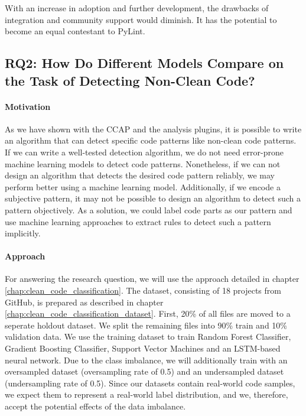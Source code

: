 With an increase in adoption and further development, the drawbacks of integration and community support would diminish. It has the potential to become an equal contestant to PyLint.

\subsection{RQ2: How Do Different Models Compare on the Task of Detecting Non-Clean Code?}\label{rq:2}
\paragraph{Motivation}
As we have shown with the CCAP and the analysis plugins, it is possible to write an algorithm that can detect specific code patterns like non-clean code patterns. If we can write a well-tested detection algorithm, we do not need error-prone machine learning models to detect code patterns. Nonetheless, if we can not design an algorithm that detects the desired code pattern reliably, we may perform better using a machine learning model. Additionally, if we encode a subjective pattern, it may not be possible to design an algorithm to detect such a pattern objectively. As a solution, we could label code parts as our pattern and use machine learning approaches to extract rules to detect such a pattern implicitly.


\paragraph{Approach}\label{par:approach}
For answering the research question, we will use the approach detailed in chapter \ref{chap:clean_code_classification}.  The dataset, consisting of 18 projects from GitHub, is prepared as described in chapter \ref{chap:clean_code_classification_dataset}. First, 20\% of all files are moved to a seperate holdout dataset. We split the remaining files into 90\% train and 10\% validation data. We use the training dataset to train Random Forest Classifier, Gradient Boosting Classifier, Support Vector Machines and an LSTM-based neural network. Due to the class imbalance, we will additionally train with an oversampled dataset (oversampling rate of 0.5) and an undersampled dataset (undersampling rate of 0.5). Since our datasets contain real-world code samples, we expect them to represent a real-world label distribution, and we, therefore, accept the potential effects of the data imbalance. 

